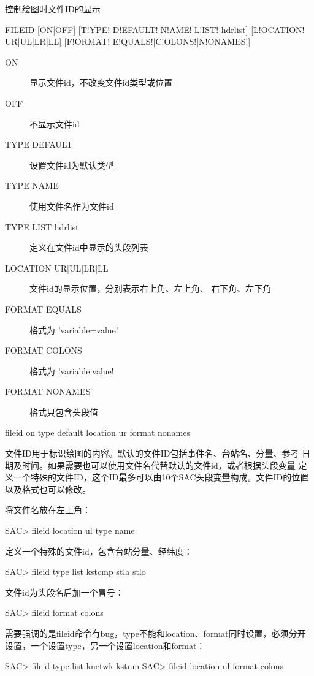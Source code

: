 \label{cmd:fileid}

控制绘图时文件ID的显示

\begin{SACSTX}
FILEID [ON|OFF] [T!YPE! D!EFAULT!|N!AME!|L!IST! hdrlist] [L!OCATION! UR|UL|LR|LL]
    [F!ORMAT! E!QUALS!|C!OLONS!|N!ONAMES!]
\end{SACSTX}

\begin{description}
\item [ON] 显示文件id，不改变文件id类型或位置
\item [OFF] 不显示文件id
\item [TYPE DEFAULT] 设置文件id为默认类型
\item [TYPE NAME] 使用文件名作为文件id
\item [TYPE LIST hdrlist] 定义在文件id中显示的头段列表
\item [LOCATION UR|UL|LR|LL] 文件id的显示位置，分别表示右上角、左上角、
    右下角、左下角
\item [FORMAT EQUALS] 格式为 !variable=value!
\item [FORMAT COLONS] 格式为 !variable:value!
\item [FORMAT NONAMES] 格式只包含头段值
\end{description}

\begin{SACDFT}
fileid on type default location ur format nonames
\end{SACDFT}

文件ID用于标识绘图的内容。默认的文件ID包括事件名、台站名、分量、参考
日期及时间。如果需要也可以使用文件名代替默认的文件id，或者根据头段变量
定义一个特殊的文件ID，这个ID最多可以由10个SAC头段变量构成。文件ID的位置
以及格式也可以修改。

将文件名放在左上角：
\begin{SACCode}
SAC> fileid location ul type name
\end{SACCode}

定义一个特殊的文件id，包含台站分量、经纬度：
\begin{SACCode}
SAC> fileid type list kstcmp stla stlo
\end{SACCode}

文件id为头段名后加一个冒号：
\begin{SACCode}
SAC> fileid format colons
\end{SACCode}

需要强调的是fileid命令有bug，type不能和location、format同时设置，必须分开设置，一个设置type，另一个设置location和format：
\begin{SACCode}
SAC> fileid type list knetwk kstnm
SAC> fileid location ul format colons
\end{SACCode}
